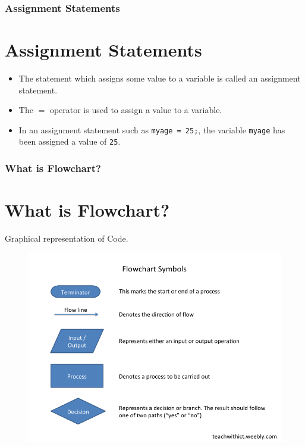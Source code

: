 \documentclass{beamer}
\begin{document}
\begin{frame}
    \frametitle{Assignment Statements}
    \section{Assignment Statements} %
    \label{sec:assignment}
    \begin{itemize}
        \item The statement which assigns some value to a variable is called an assignment statement.
        \item The $=$ operator is used to assign a value to a variable.
        \item In an assignment statement such as \texttt{myage = 25;}, the variable \texttt{myage} has been assigned a value of \texttt{25}.
    \end{itemize}
\end{frame}

\begin{frame}
\frametitle{What is Flowchart?}
\section{What is Flowchart?}
Graphical representation of Code.
\begin{figure}
        \centering
        \includegraphics[scale=0.38]{flowchart}
    \end{figure}
\end{frame}
\end{document}

